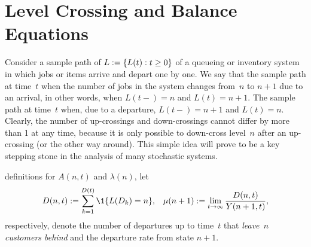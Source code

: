 \documentclass[stochastic-or.tex]{subfiles}
\begin{document}
\section{Level Crossing and Balance Equations}
\label{sec:level-cross-balance}

Consider a sample path of $L:=\{L(t) : t\geq 0\}$ of a queueing or inventory system in which jobs or items arrive and depart one by one.
We say that the sample path  at time~$t$ when the number of jobs in the system changes from~$n$ to $n+1$ due to an arrival, in other words, when $L(t-)=n$ and $L(t)=n+1$.
The sample path  at time~$t$ when, due to a departure, $L(t-)=n+1$ and $L(t)=n$.
Clearly, the number of up-crossings and down-crossings cannot differ by more than 1 at any time, because it is only possible to down-cross level~$n$ after an up-crossing (or the other way around).
This simple idea will prove to be a key stepping stone in the analysis of many stochastic systems.




 definitions for $A(n,t)$  and $\lambda(n)$,  let
\begin{align}
 D(n,t) &:=  \sum_{k=1}^{D(t)} \1{\L(D_k) = n}, & \mu(n+1) := \lim_{t\to\infty} \frac{D(n,t)}{Y(n+1,t)},
 \end{align}
respectively, denote the number of departures up to time~$t$ that\emph{ leave~$n$ customers behind} and the departure rate from state $n+1$.
\end{document}
